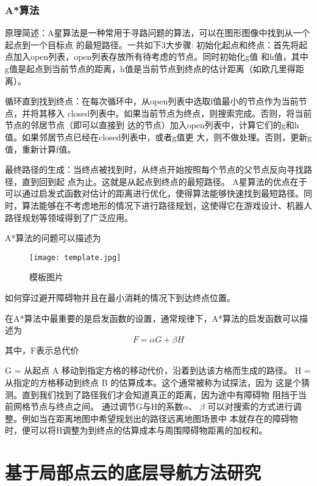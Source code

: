 \subsubsection{A*算法}
原理简述：A星算法是一种常用于寻路问题的算法，可以在图形图像中找到从一个起点到一个目标点
的最短路径。一共如下3大步骤:
初始化起点和终点：首先将起点加入open列表，open列表存放所有待考虑的节点。同时初始化g值
和h值，其中g值是起点到当前节点的距离，h值是当前节点到终点的估计距离（如欧几里得距离）。

循环直到找到终点：在每次循环中，从open列表中选取f值最小的节点作为当前节点，并将其移入
closed列表中。如果当前节点为终点，则搜索完成。否则，将当前节点的邻居节点（即可以直接到
达的节点）加入open列表中，计算它们的g和h值。如果邻居节点已经在closed列表中，或者g值更
大，则不做处理。否则，更新g值，重新计算f值。

最终路径的生成：当终点被找到时，从终点开始按照每个节点的父节点反向寻找路径，直到回到起
点为止。这就是从起点到终点的最短路径。
A星算法的优点在于可以通过启发式函数对估计的距离进行优化，使得算法能够快速找到最短路径。同时，算法能够在不考虑地形的情况下进行路径规划，这使得它在游戏设计、机器人路径规划等领域得到了广泛应用。

A*算法的问题可以描述为
\begin{figure}[ht]
    \centering
    \texttt{[image: template.jpg]}
    \caption{模板图片}
\end{figure}

如何穿过避开障碍物并且在最小消耗的情况下到达终点位置。

在A*算法中最重要的是启发函数的设置，通常规律下，A*算法的启发函数可以描述为
\begin{equation}
    F = \alpha G +\beta  H
\end{equation}
其中，F表示总代价

G = 从起点 A 移动到指定方格的移动代价，沿着到达该方格而生成的路径。
H = 从指定的方格移动到终点 B 的估算成本。这个通常被称为试探法，因为
这是个猜测。直到我们找到了路径我们才会知道真正的距离，因为途中有障碍物
阻挡于当前网格节点与终点之间。
通过调节G与H的系数$\alpha$、 $\beta$ 可以对搜索的方式进行调整。例如当在距离地图中希望规划出的路径远离地图场景中
本就存在的障碍物时，便可以将H调整为到终点的估算成本与周围障碍物距离的加权和。




\section{基于局部点云的底层导航方法研究}

